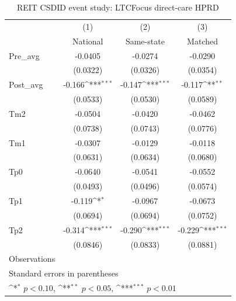 \begin{table}[htbp]\centering
\def\sym#1{\ifmmode^{#1}\else\(^{#1}\)\fi}
\caption{REIT CSDID event study: LTCFocus direct-care HPRD}
\begin{tabular}{l*{3}{c}}
\hline\hline
                    &\multicolumn{1}{c}{(1)}&\multicolumn{1}{c}{(2)}&\multicolumn{1}{c}{(3)}\\
                    &\multicolumn{1}{c}{National}&\multicolumn{1}{c}{Same-state}&\multicolumn{1}{c}{Matched}\\
\hline
Pre\_avg             &     -0.0405         &     -0.0274         &     -0.0290         \\
                    &    (0.0322)         &    (0.0326)         &    (0.0354)         \\
[1em]
Post\_avg            &      -0.166\sym{***}&      -0.147\sym{***}&      -0.117\sym{**} \\
                    &    (0.0533)         &    (0.0530)         &    (0.0589)         \\
[1em]
Tm2                 &     -0.0504         &     -0.0420         &     -0.0462         \\
                    &    (0.0738)         &    (0.0743)         &    (0.0776)         \\
[1em]
Tm1                 &     -0.0307         &     -0.0129         &     -0.0118         \\
                    &    (0.0631)         &    (0.0634)         &    (0.0680)         \\
[1em]
Tp0                 &     -0.0640         &     -0.0541         &     -0.0552         \\
                    &    (0.0493)         &    (0.0496)         &    (0.0574)         \\
[1em]
Tp1                 &      -0.119\sym{*}  &     -0.0967         &     -0.0673         \\
                    &    (0.0694)         &    (0.0694)         &    (0.0752)         \\
[1em]
Tp2                 &      -0.314\sym{***}&      -0.290\sym{***}&      -0.229\sym{***}\\
                    &    (0.0846)         &    (0.0833)         &    (0.0881)         \\
\hline
Observations        &                     &                     &                     \\
\hline\hline
\multicolumn{4}{l}{\footnotesize Standard errors in parentheses}\\
\multicolumn{4}{l}{\footnotesize \sym{*} \(p<0.10\), \sym{**} \(p<0.05\), \sym{***} \(p<0.01\)}\\
\end{tabular}
\end{table}
